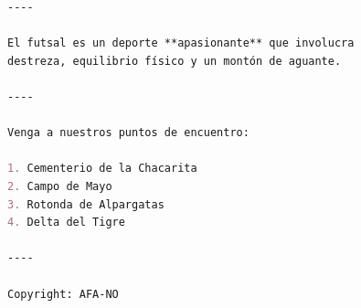 \documentclass[12pt, addpoints]{../../common/epyl_exam_template}
\begin{document}
\begin{questions}
\begin{lstlisting}[language=markdown]
----

El futsal es un deporte **apasionante** que involucra
destreza, equilibrio físico y un montón de aguante.

----

Venga a nuestros puntos de encuentro:

1. Cementerio de la Chacarita
2. Campo de Mayo
3. Rotonda de Alpargatas
4. Delta del Tigre

----

Copyright: AFA-NO
    \end{lstlisting}
    \begin{solution}
    \end{solution}


\end{questions}
\end{document}
